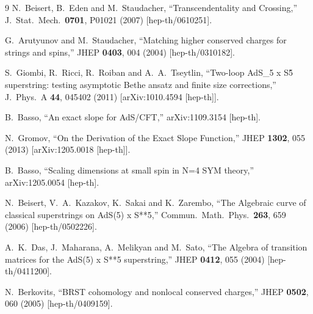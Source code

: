\documentclass[a4paper,11pt]{article}
\numberwithin{equation}{section}
\begin{document}
\begin{thebibliography} {9}
  N.~Beisert, B.~Eden and M.~Staudacher,
  ``Transcendentality and Crossing,''
  J.\ Stat.\ Mech.\  {\bf 0701}, P01021 (2007)
  [hep-th/0610251].

  G.~Arutyunov and M.~Staudacher,
  ``Matching higher conserved charges for strings and spins,''
  JHEP {\bf 0403}, 004 (2004)
  [hep-th/0310182].

  S.~Giombi, R.~Ricci, R.~Roiban and A.~A.~Tseytlin,
  ``Two-loop AdS\_5 x S\^5 superstring: testing asymptotic Bethe ansatz and finite size corrections,''
  J.\ Phys.\ A {\bf 44}, 045402 (2011)
  [arXiv:1010.4594 [hep-th]].

  B.~Basso,
  ``An exact slope for AdS/CFT,''
  arXiv:1109.3154 [hep-th].

  N.~Gromov,
  ``On the Derivation of the Exact Slope Function,''
  JHEP {\bf 1302}, 055 (2013)
  [arXiv:1205.0018 [hep-th]].

  B.~Basso,
  ``Scaling dimensions at small spin in N=4 SYM theory,''
  arXiv:1205.0054 [hep-th].

  N.~Beisert, V.~A.~Kazakov, K.~Sakai and K.~Zarembo,
  ``The Algebraic curve of classical superstrings on AdS(5) x S**5,''
  Commun.\ Math.\ Phys.\  {\bf 263}, 659 (2006)
  [hep-th/0502226].

  A.~K.~Das, J.~Maharana, A.~Melikyan and M.~Sato,
  ``The Algebra of transition matrices for the AdS(5) x S**5 superstring,''
  JHEP {\bf 0412}, 055 (2004)
  [hep-th/0411200].

  N.~Berkovits,
  ``BRST cohomology and nonlocal conserved charges,''
  JHEP {\bf 0502}, 060 (2005)
  [hep-th/0409159].


\end{thebibliography}
\end{document}
